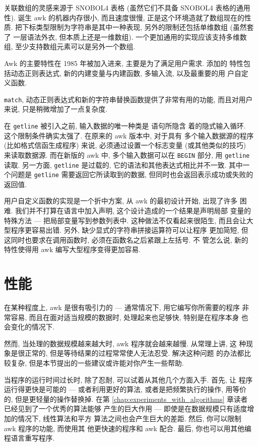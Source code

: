 关联数组的灵感来源于 SNOBOL4 表格 (虽然它们不具备 SNOBOL4 表格的通用性).
诞生 awk 的机器内存很小, 而且速度很慢, 正是这个环境造就了数组现在的性质.
把下标类型限制为字符串是其中一种表现, 另外的限制还包括单维数组 (虽然套了
一层语法外衣, 但本质上还是一维数组). 一个更加通用的实现应该支持多维数组,
至少支持数组元素可以是另外一个数组.

Awk 的主要特性在 1985 年被加入进来, 主要是为了满足用户需求. 添加的
特性包括动态正则表达式, 新的内建变量与内建函数, 多输入流, 以及最重要的用
户自定义函数.

\texttt{match}, 动态正则表达式和新的字符串替换函数提供了非常有用的功能,
而且对用户来说, 只是稍微增加了一点复杂度.

在 \texttt{getline} 被引入之前, 输入数据的唯一种类是 \patact 语句所隐含
着的隐式输入循环. 这个限制条件确实太强了. 在原来的 awk 版本中, 对于具有
多个输入数据源的程序 (比如格式信函生成程序) 来说, 必须通过设置一个标志变量
(或其他类似的技巧) 来读取数据源. 而在新版的 awk 中, 多个输入数据可以在
\texttt{BEGIN} 部分, 用 \texttt{getline} 读取. 另一方面, \texttt{getline}
是过载的, 它的语法和其他表达式相比并不一致. 其中一个问题是 \texttt{getline}
需要返回它所读取到的数据, 但同时也会返回表示成功或失败的返回值.

用户自定义函数的实现是一个折中方案, 从 awk 的最初设计开始, 出现了许多
困难. 我们并不打算在语言中加入声明, 这个设计造成的一个结果是声明局部
变量的特殊方法 --- 把局部变量写到参数列表中. 这种做法不仅看起来很陌生,
而且会让大型程序更容易出错. 另外, 缺少显式的字符串拼接运算符可以让程序
更加简短, 但这同时也要求在调用函数时, 必须在函数名之后紧跟上左括号. 不
管怎么说, 新的特性使得用 awk 编写大型程序变得更加容易.

\section{性能}
\label{sec:performance}
在某种程度上, awk 是很有吸引力的 --- 通常情况下, 用它编写你所需要的程序
非常容易, 而且在面对适当规模的数据时, 处理起来也足够快, 特别是在程序本身
也会变化的情况下.

然而, 当处理的数据规模越来越大时, awk 程序就会越来越慢. 从常理上讲, 这
种现象是很正常的, 但是等待结果的过程常常使人无法忍受. 解决这种问题
的办法都比较复杂, 但是本节提出的一些建议或许能对你产生一些帮助.

当程序的运行时间过长时, 除了忍耐, 可以试着从其他几个方面入手. 首先, 让
程序运行得更快是可能的 --- 或者利用更好的算法, 或者是把频繁执行的操作,
用等价的, 但是更轻量的操作替换掉. 在第
\ref{chap:experiments_with_algorithms} 章读者已经见到了一个优秀的算法能够
产生的巨大作用 --- 即使是在数据规模只有适度增加的情况下, 线性算法和平方
算法之间也会产生巨大的差距. 然后, 你可以限制 awk 程序的功能, 而使用其
他更快速的程序和 awk 配合. 最后, 你也可以用其他编程语言重写程序.

